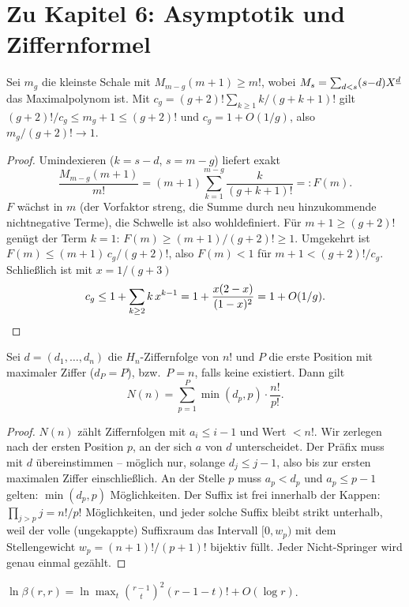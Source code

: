 \section*{Zu Kapitel 6: Asymptotik und Ziffernformel}

\begin{satz}
Sei $m_g$ die kleinste Schale mit
$M_{m-g}(m{+}1)\ge m!$, wobei $M_s=\sum_{d<s}(s{-}d)X^{\underline{d}}$ das
Maximalpolynom ist. Mit
$c_g=(g{+}2)!\sum_{k\ge1}k/(g{+}k{+}1)!$ gilt
$(g{+}2)!/c_g\le m_g+1\le(g{+}2)!$ und $c_g=1+O(1/g)$, also
$m_g/(g{+}2)!\to1$.
\end{satz}

\begin{proof}
Umindexieren ($k=s{-}d$, $s=m{-}g$) liefert exakt
\[
\frac{M_{m-g}(m{+}1)}{m!}
=(m{+}1)\sum_{k=1}^{m-g}\frac{k}{(g{+}k{+}1)!}=:F(m).
\]
$F$ wächst in $m$ (der Vorfaktor streng, die Summe durch neu
hinzukommende nichtnegative Terme), die Schwelle ist also
wohldefiniert. Für $m{+}1\ge(g{+}2)!$ genügt der Term $k{=}1$:
$F(m)\ge(m{+}1)/(g{+}2)!\ge1$. Umgekehrt ist
$F(m)\le(m{+}1)\,c_g/(g{+}2)!$, also $F(m)<1$ für
$m{+}1<(g{+}2)!/c_g$.
Schließlich ist mit $x=1/(g{+}3)$
\[
c_g\le1+\sum_{k\ge2}k\,x^{k-1}
=1+\frac{x(2-x)}{(1-x)^2}=1+O(1/g). \qedhere
\]
\end{proof}

\begin{satz}
Sei $d=(d_1,\ldots,d_n)$ die $H_n$-Ziffernfolge von $n!$ und $P$
die erste Position mit maximaler Ziffer ($d_P=P$), bzw.\ $P=n$,
falls keine existiert. Dann gilt
\[
N(n)=\sum_{p=1}^{P}\min(d_p,p)\cdot\frac{n!}{p!}.
\]
\end{satz}

\begin{proof}
$N(n)$ zählt Ziffernfolgen mit $a_i\le i-1$ und Wert $<n!$. Wir
zerlegen nach der ersten Position $p$, an der sich $a$ von $d$
unterscheidet. Der Präfix muss mit $d$ übereinstimmen -- möglich
nur, solange $d_j\le j-1$, also bis zur ersten maximalen Ziffer
einschließlich. An der Stelle $p$ muss $a_p<d_p$ und $a_p\le p-1$
gelten: $\min(d_p,p)$ Möglichkeiten. Der Suffix ist frei innerhalb
der Kappen: $\prod_{j>p}j=n!/p!$ Möglichkeiten, und jeder solche
Suffix bleibt strikt unterhalb, weil der volle (ungekappte)
Suffixraum das Intervall $[0,w_p)$ mit dem Stellengewicht
$w_p=(n{+}1)!/(p{+}1)!$ bijektiv füllt. Jeder Nicht-Springer wird genau
einmal gezählt.
\end{proof}

\begin{satz}
$\ln\beta(r,r)=\ln\max_{t}\binom{r-1}{t}^2(r{-}1{-}t)!+O(\log r)$.
\end{satz}

